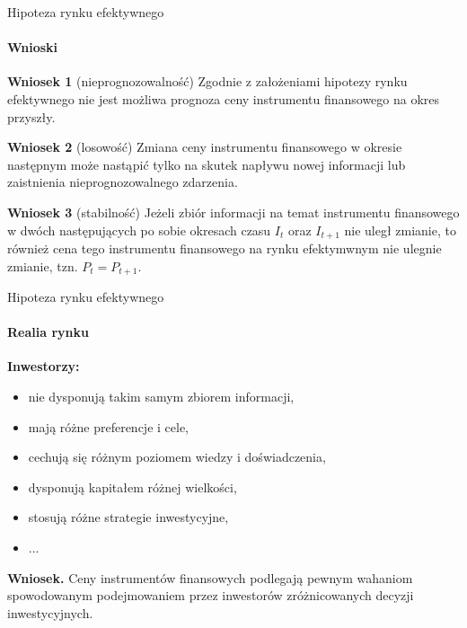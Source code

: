 \documentclass[a4paper, 11pt]{beamer}
\begin{document}
	\begin{frame}{Hipoteza rynku efektywnego}
		\framesubtitle{Wnioski}
		\begin{block}{\textbf{Wniosek 1} (nieprognozowalność)}
			Zgodnie z założeniami hipotezy rynku efektywnego nie jest możliwa prognoza ceny instrumentu
			finansowego na okres przyszły.
		\end{block}
		\begin{block}{\textbf{Wniosek 2} (losowość)}
			Zmiana ceny instrumentu finansowego w okresie następnym może nastąpić tylko na skutek
			napływu nowej informacji lub zaistnienia nieprognozowalnego zdarzenia.
		\end{block}
		\begin{block}{\textbf{Wniosek 3} (stabilność)}
			Jeżeli zbiór informacji na temat instrumentu finansowego w dwóch następujących po sobie
			okresach czasu $I_t$ oraz $I_{t+1}$ nie uległ zmianie, to również cena tego instrumentu
			finansowego na rynku efektymwnym nie ulegnie zmianie, tzn. $P_t = P_{t+1}.$
		\end{block}
	\end{frame}

	\begin{frame}{Hipoteza rynku efektywnego}
		\framesubtitle{Realia rynku}
		\textbf{Inwestorzy:}
		\begin{itemize}
			\item nie dysponują takim samym zbiorem informacji,
			\item mają różne preferencje i cele,
			\item cechują się różnym poziomem wiedzy i doświadczenia,
			\item dysponują kapitałem różnej wielkości,
			\item stosują różne strategie inwestycyjne,
			\item ...
		\end{itemize}
		\begin{alert}{\textbf{Wniosek.}}
			Ceny instrumentów finansowych podlegają pewnym wahaniom spowodowanym
			podejmowaniem przez inwestorów zróżnicowanych decyzji inwestycyjnych.
		\end{alert}
	\end{frame}
	
\end{document}
